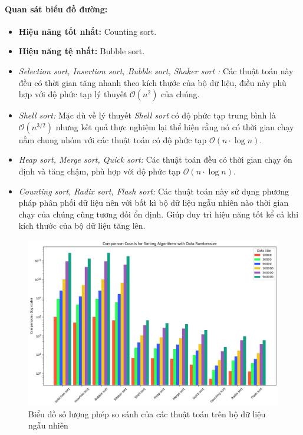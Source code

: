     \paragraph{Quan sát biểu đồ đường:}
    \begin{itemize}
        \item \textbf{Hiệu năng tốt nhất:} Counting sort.
        \item \textbf{Hiệu năng tệ nhất:} Bubble sort.
        \item \textit{Selection sort, Insertion sort, Bubble sort, Shaker sort :} Các thuật toán này đều có thời gian tăng nhanh theo kích thước của bộ dữ liệu, điều này phù hợp với độ phức tạp lý thuyết $\mathcal{O}(n^2)$ của chúng.
        \item \textit{Shell sort:} Mặc dù về lý thuyết \textit{Shell sort} có độ phức tạp trung bình là $\mathcal{O}(n^{3/2})$ nhưng kết quả thực nghiệm lại thể hiện rằng nó có thời gian chạy nằm chung nhóm với các thuật toán có độ phức tạp $\mathcal{O}(n \cdot \log n)$. 
        \item \textit{Heap sort, Merge sort, Quick sort:} Các thuật toán đều có thời gian chạy ổn định và tăng chậm, phù hợp với độ phức tạp $\mathcal{O}(n \cdot \log n)$.
        \item \textit{Counting sort, Radix sort, Flash sort:} Các thuật toán này sử dụng phương pháp phân phối dữ liệu nên với bất kì bộ dữ liệu ngẫu nhiên nào thời gian chạy của chúng cũng tương đối ổn định. Giúp duy trì hiệu năng tốt kể cả khi kích thước của bộ dữ liệu tăng lên.
    \end{itemize}

    \newpage
    \begin{figure}[H]
        \centering        
        \includegraphics[width = 1\linewidth]{img/experiment/comparison/comparision_randomesize.jpg}
        \caption{Biểu đồ số lượng phép so sánh của các thuật toán trên bộ dữ liệu ngẫu nhiên}
    \end{figure}
